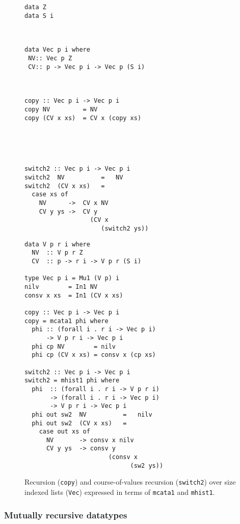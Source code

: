 \documentclass[letterpaper,12pt]{article}
\begin{document}
\begin{figure}
\begin{minipage}{.5\textwidth}
\begin{verbatim}
data Z
data S i



data Vec p i where
 NV:: Vec p Z
 CV:: p -> Vec p i -> Vec p (S i)



copy :: Vec p i -> Vec p i
copy NV         = NV
copy (CV x xs)  = CV x (copy xs)





switch2 :: Vec p i -> Vec p i
switch2  NV          =   NV
switch2  (CV x xs)   =
  case xs of
    NV      ->  CV x NV
    CV y ys ->  CV y
                  (CV x
                     (switch2 ys))
\end{verbatim}
\end{minipage}
\begin{minipage}{.45\textwidth}
\begin{verbatim}
data V p r i where
  NV  :: V p r Z
  CV  :: p -> r i -> V p r (S i)

type Vec p i = Mu1 (V p) i
nilv        = In1 NV
consv x xs  = In1 (CV x xs)

copy :: Vec p i -> Vec p i
copy = mcata1 phi where
  phi :: (forall i . r i -> Vec p i)
      -> V p r i -> Vec p i
  phi cp NV        = nilv
  phi cp (CV x xs) = consv x (cp xs)

switch2 :: Vec p i -> Vec p i
switch2 = mhist1 phi where
  phi  :: (forall i . r i -> V p r i)
       -> (forall i . r i -> Vec p i)
       -> V p r i -> Vec p i
  phi out sw2  NV          =   nilv
  phi out sw2  (CV x xs)   =
    case out xs of
      NV       -> consv x nilv
      CV y ys  -> consv y
                       (consv x
                             (sw2 ys))
\end{verbatim}
\end{minipage}
\caption{Recursion (\texttt{copy}) and course-of-values recursion (\texttt{switch2})
over size indexed lists (\texttt{Vec}) expressed in terms of \texttt{mcata1} and \texttt{mhist1}.}
\label{fig:vec}
\end{figure}

\subsubsection{Mutually recursive datatypes}
\end{document}

